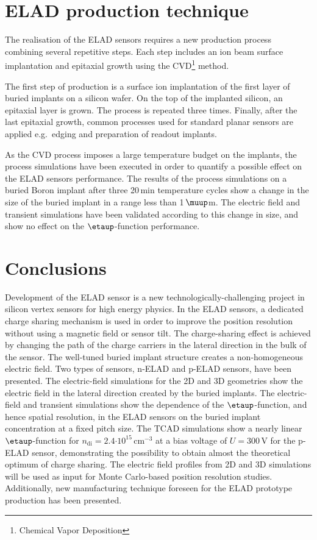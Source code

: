 \documentclass[a4paper,11pt]{article}
\begin{document}
\section{ELAD production technique}
\label{sec:pr}
The realisation of the ELAD sensors requires a new production process combining several repetitive steps.
Each step includes an ion beam surface implantation and epitaxial growth using the CVD\footnote{Chemical Vapor Deposition} method. 

The first step of production is a surface ion implantation of the first layer of buried implants on a silicon wafer.
On the top of the implanted silicon, an epitaxial layer is grown.
The process is repeated three times. 
Finally, after the last epitaxial growth, common processes used for standard planar sensors are applied e.g.\ edging and preparation of readout implants.

As the CVD process imposes a large temperature budget on the implants, the process simulations have been executed in order to quantify a possible effect on the ELAD sensors performance. 
The results of the process simulations on a buried Boron implant after three 20\,min temperature cycles show a change in the size of the buried implant in a range less than 1\,$\muup$m.
The electric field and transient simulations have been validated according to this change in size, and show no effect on the $\etaup$-function performance.


\section{Conclusions}
Development of the ELAD sensor is a new technologically-challenging project in silicon vertex sensors for high energy physics. 
In the ELAD sensors, a dedicated charge sharing mechanism is used in order to improve the position resolution without using a magnetic field or sensor tilt.
The charge-sharing effect is achieved by changing the path of the charge carriers in the lateral direction in the bulk of the sensor.
The well-tuned buried implant structure creates a non-homogeneous electric field.
Two types of sensors, n-ELAD and p-ELAD sensors, have been presented.
The electric-field simulations for the 2D and 3D geometries show the electric field in the lateral direction created by the buried implants.
The electric-field and transient simulations show the dependence of the $\etaup$-function, and hence spatial resolution, in the ELAD sensors on the buried implant concentration at a fixed pitch size.
The TCAD simulations show a nearly linear $\etaup$-function for $n\mathrm{_{di}} = 2.4 \mathrm{\cdot10^{15}\,cm^{-3}}$ at a bias voltage of $U=300$\,V for the p-ELAD sensor,
 demonstrating the possibility to obtain almost the theoretical optimum of charge sharing.
The electric field profiles from 2D and 3D simulations will be used as input for Monte Carlo-based position resolution studies.
Additionally, new manufacturing technique foreseen for the ELAD prototype production has been presented. 
\end{document}
